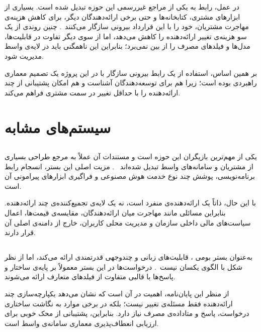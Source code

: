 در عمل، رابط  به یکی از مراجع غیررسمی این حوزه تبدیل شده است.
بسیاری از ابزارهای مشتری، کتابخانه‌ها و حتی برخی ارائه‌دهندگان دیگر، برای
کاهش هزینه‌ی مهاجرت مشتریان، خود را با این قرارداد بیرونی سازگار
می‌کنند~\cite{openai2024,groq2024,openrouter2024}. چنین روندی از یک سو
هزینه‌ی تغییر ارائه‌دهنده را کاهش می‌دهد، اما از سوی دیگر تفاوت در
قابلیت‌ها، مدل‌ها و فیلدهای مصرف را از بین نمی‌برد؛ بنابراین این
ناهمگنی باید در لایه‌ی واسط مدیریت شود.

بر همین اساس، استفاده از یک رابط بیرونی سازگار با  در این
پروژه یک تصمیم معماری راهبردی بوده است؛ زیرا هم برای توسعه‌دهندگان
آشناست و هم امکان پشتیبانی از چند ارائه‌دهنده را با حداقل تغییر در
سمت مشتری فراهم می‌کند.

\section{سیستم‌های مشابه}

\subsection{}

 یکی از مهم‌ترین بازیگران این حوزه است و مستندات آن عملاً
به مرجع طراحی بسیاری از مشتریان و سامانه‌های واسط تبدیل شده‌اند
~\cite{openai2024}. مزیت اصلی این بستر، انسجام رابط برنامه‌نویسی،
پوشش چند نوع خدمت هوش مصنوعی و فراگیری ابزارهای پیرامونی آن است.

با این حال،  ذاتاً یک ارائه‌دهنده‌ی منفرد است، نه یک لایه‌ی
تجمیع‌کننده‌ی چند ارائه‌دهنده. بنابراین مسائلی مانند مهاجرت میان
ارائه‌دهندگان، مقایسه‌ی قیمت‌ها، اعمال سیاست‌های مالی داخلی سازمان و
مدیریت محلی کاربران، خارج از دامنه‌ی اصلی آن قرار دارند.

\subsection{}

 به‌عنوان بستر بومی ، قابلیت‌های زبانی و
چندوجهی قدرتمندی ارائه می‌کند، اما از نظر شکل  با الگوی
 یکسان نیست~\cite{gemini2024}. درخواست‌ها در این بستر معمولاً
بر پایه‌ی ساختار  و پاسخ‌ها با قالبی متفاوت از
فیلدهای متعارف  ارائه می‌شوند.

از منظر این پایان‌نامه، اهمیت  در آن است که نشان می‌دهد
یکپارچه‌سازی چند ارائه‌دهنده فقط مسئله‌ی تغییر  نیست؛ بلکه
در برخی موارد به نگاشت ساختاری درخواست، پاسخ و متاداده‌ی مصرف نیاز دارد.
بنابراین، پشتیبانی از  محک خوبی برای ارزیابی انعطاف‌پذیری
معماری سامانه‌ی واسط است.

